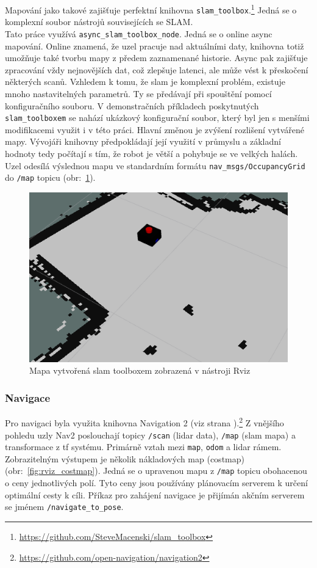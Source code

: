 Mapování jako takové zajišťuje perfektní knihovna \verb|slam_toolbox|.\footnote{\url{https://github.com/SteveMacenski/slam_toolbox}} Jedná se o komplexní soubor nástrojů souvisejících se SLAM. \\ Tato práce využívá \verb|async_slam_toolbox_node|. Jedná se o online async mapování. Online znamená, že uzel pracuje nad aktuálními daty, knihovna totiž umožňuje také tvorbu mapy z předem zaznamenané historie. Async pak zajišťuje zpracování vždy nejnovějších dat, což zlepšuje latenci, ale může vést k přeskočení některých scanů. Vzhledem k tomu, že slam je komplexní problém, existuje mnoho nastavitelných parametrů. Ty se předávají při spouštění pomocí konfiguračního souboru. V demonstračních příkladech poskytnutých \verb|slam_toolboxem| se nahází ukázkový konfigurační soubor, který byl jen s menšími modifikacemi využit i v této práci. Hlavní změnou je zvýšení rozlišení vytvářené mapy. Vývojáři knihovny předpokládají její využití v průmyslu a základní hodnoty tedy počítají s tím, že robot je větší a pohybuje se ve velkých halách. Uzel odesílá výslednou mapu ve standardním formátu \verb|nav_msgs/OccupancyGrid| do \verb|/map| topicu (obr:~\ref{fig:rviz_slam_map}).

\begin{figure}[h!]
	\centering
	\includegraphics[scale=0.7]{obrazky-figures/slam.png}
	\caption{Mapa vytvořená slam toolboxem zobrazená v nástroji Rviz}
	\label{fig:rviz_slam_map}
\end{figure}

\subsubsection*{Navigace}
Pro navigaci byla využita knihovna Navigation 2 (viz strana \pageref{theory:nav2}).\footnote{\url{https://github.com/open-navigation/navigation2}} 
Z vnějšího pohledu uzly Nav2 poslouchají topicy \verb|/scan| (lidar data), \verb|/map| (slam mapa) a transformace z tf systému. Primárně vztah mezi \verb|map|, \verb|odom| a lidar rámem. Zobrazitelným výstupem je několik nákladových map (costmap) (obr:~\ref{fig:rviz_costmap}). Jedná se o upravenou mapu z \verb|/map| topicu obohacenou o ceny jednotlivých polí. Tyto ceny jsou používány plánovacím serverem k určení optimální cesty k cíli. Příkaz pro zahájení navigace je přijímán akčním serverem se jménem \verb|/navigate_to_pose|. 

